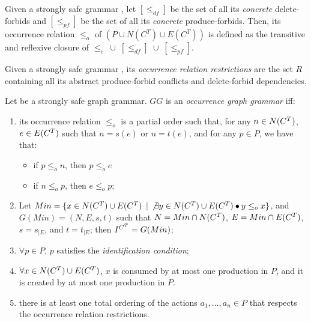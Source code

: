 \begin{definition} Given a strongly safe grammar \doublyTypedGraphGrammarCore{}, let $[\leq_{df}]$ be the set of all its \emph{concrete} delete-forbids and $[\leq_{pf}]$ be the set of all its \emph{concrete} produce-forbids. Then, its occurrence relation $\leq_o$ of $(P \cup N(C^T) \cup E(C^T))$ is defined as the transitive and reflexive closure of \mbox{$\leq_{c}$ $\cup$ $[\leq_{df}]$ $\cup$ $[\leq_{pf}]$}.
\end{definition}

\begin{definition} Given a strongly safe grammar \doublyTypedGraphGrammarCore{}, its \emph{occurrence relation restrictions} are the set $R$ containing all its abstract produce-forbid conflicts and delete-forbid dependencies.
\end{definition}

\begin{definition}\label{def:ogg} Let \doublyTypedGraphGrammarCore{} be a strongly safe graph grammar. $GG$ is an \emph{occurrence graph grammar} iff:

  \begin{enumerate}
    \item its occurrence relation $\leq_{o}$ is a partial order such that, for any \mbox{$n \in N(C^T)$}, \mbox{$e \in E(C^T)$} such that $n = s(e)$ or $n = t(e)$, and for any $p \in P$, we have that:
      \begin{itemize}
        \item if $p \leq_o n$, then $p \leq_o e$
        \item if $n \leq_o p$, then $e \leq_o p$;
      \end{itemize}
    \item Let $Min = \{x \in N(C^T) \cup E(C^T)$ $|$ $\not\exists y \in N(C^T) \cup E(C^T)\bullet y \leq_o x \}$, and $G(Min) = \left(N,E,s,t\right)$ such that $N = Min \cap N(C^T)$, $E = Min \cap E(C^T)$, $s = s_{|E}$, and $t = t_{|E}$; then $\mbox{\ensuremath{I^{C^T}}} = G(Min)$;
    \item $\forall p \in P$, $p$ satisfies the \emph{identification condition};
    \item $\forall x \in N(C^T) \cup E(C^T)$, $x$ is consumed by at most one production in $P$, and it is created by at most one production in $P$.
    \item there is at least one total ordering of the actions $a_1,\ldots,a_n \in P$ that respects the occurrence relation restrictions.
  \end{enumerate}
\end{definition}

